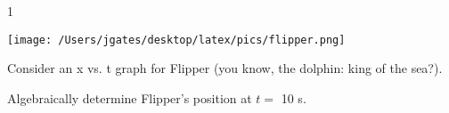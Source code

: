 
\AddToShipoutPicture*{\BackgroundPic}

\addtocounter {ProbNum} {1}

\begin{floatingfigure}[r]{.4\textwidth}
\texttt{[image: /Users/jgates/desktop/latex/pics/flipper.png]}
\end{floatingfigure}
 
{\bf \Large{}} Consider an x vs. t graph for Flipper (you know, the dolphin: king of the sea?).

\bigskip

Algebraically determine Flipper's position at ${t =}$ 10 s.


\vfill

\newpage